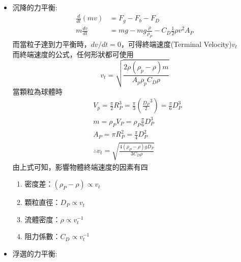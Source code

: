 \documentclass[../main.tex]{subfiles}
\begin{document}
\begin{itemize}
\begin{itemize}
    P.S. 流力與單操對慣性力的定義不同
    \begin{itemize}
      \item 流力:
      \begin{equation}
        \frac{F}{A} = \frac{\vec{\bm P}(\text{(動量)})}{
          tA
        } = \frac{m\cdot v}{tA} = \frac{\dot m v}{A} = \frac{(\rho \vec{\bm v}A)\vec{\bm v}}{A} 
        = \rho \vec{\bm v}\vec{\bm v}
      \end{equation}
      \item 單操:
      \begin{equation}
        \frac{F}{A} = \frac{\text{KE(動能)}/L}{A} = \frac{\frac{1}{2}mv^2}{V} = \frac{1}{2}\rho v^2
      \end{equation}
    \end{itemize}
  \end{itemize}
  \item 沉降的力平衡:
  \begin{align}
    \frac{d}{dt}(mv) &= F_g - F_b - F_D \\
    m\frac{dv}{dt} &= mg - mg \frac{\rho}{\rho_P} - C_D \frac{1}{2}\rho v^2 A_P 
  \end{align}
  而當粒子達到力平衡時，$dv/dt = 0$，可得終端速度(Terminal Velocity)$v_t$\\
  而終端速度的公式，任何形狀都可使用
  \begin{equation}
    \boxed{v_t = \sqrt{\frac{2\rho(\rho_p-\rho)m}{A_p \rho_p C_D \rho}}}
  \end{equation}
  當顆粒為球體時
  \begin{align}
    &V_p = \frac{\pi}{2}R_P^3 = \frac{\pi}{3}\left(
      \frac{D_P}{2}^3
    \right) = \frac{\pi}{6}D_P^3 \\
    &m = \rho_P V_P = \rho_P \frac{\pi}{6}D_P^3 \\
    &A_P = \pi R_P^2 = \frac{\pi}{4}D_P^2 \\
    &\therefore v_t = \sqrt{\frac{4(\rho_P - \rho)g D_P}{3 C_D \rho}} 
  \end{align}
  由上式可知，影響物體終端速度的因素有四
  \begin{enumerate}
    \item 密度差：$(\rho_P - \rho) \propto v_t$
    \item 顆粒直徑：$D_P \propto v_t$
    \item 流體密度：$\rho \propto v_t^{-1}$
    \item 阻力係數：$C_D \propto v_t^{-1}$
  \end{enumerate}
  \item 浮選的力平衡:

\end{itemize}
\end{document}
